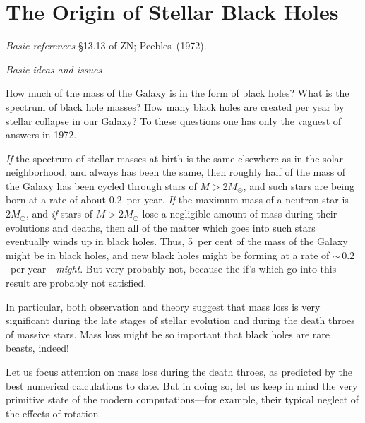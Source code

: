 
\section{The Origin of Stellar Black Holes}
\label{sec:3}

\textit{Basic references}\quad
\S13.13 of ZN\cite{ZN1971};
Peebles~(1972)\cite{Peebles1972}.

\bigskip\noindent
\textit{Basic ideas and issues}

\medskip\noindent
How much of the mass of the Galaxy is in the form of black holes?  What is the
spectrum of black hole masses?  How many black holes are created per year by
stellar collapse in our Galaxy?  To these questions one has only the vaguest of
answers in 1972.

\textit{If\/} the spectrum of stellar masses at birth is the same elsewhere as in the solar
neighborhood, and always has been the same, then roughly half of the mass of the
Galaxy has been cycled through stars of $M > 2M_\odot$, and such stars are being
born at a rate of about 0.2~per year.  \textit{If\/} the maximum mass of a neutron star is
$2M_\odot$, and \textit{if\/} stars of $M > 2M_\odot$ lose a negligible amount of mass during their
evolutions and deaths, then all of the matter which goes into such stars eventually
winds up in black holes.  Thus, 5~per cent of the mass of the Galaxy might be in
black holes, and new black holes might be forming at a rate of ${\sim}\,0.2$~per
year---\textit{might}.  But very probably not, because the if's which go into this result
are probably not satisfied.

In particular, both observation and theory suggest that mass loss is very
significant during the late stages of stellar evolution and during the death throes
of massive stars.  Mass loss might be so important that black holes are rare
beasts, indeed!

Let us focus attention on mass loss during the death throes, as predicted by
the best numerical calculations to date.  But in doing so, let us keep in mind the
very primitive state of the modern computations---for example, their typical
neglect of the effects of rotation.

